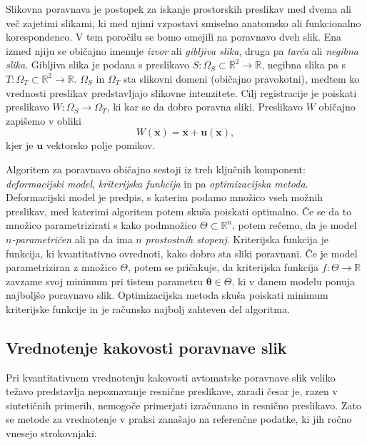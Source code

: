 \documentclass[journal]{IEEEtran}
\begin{document}
Slikovna poravnava je postopek za iskanje prostorskih preslikav med dvema ali več zajetimi slikami, ki med njimi vzpostavi smiselno anatomsko ali funkcionalno korespondenco. V tem poročilu se bomo omejili na poravnavo dveh slik. Ena izmed njiju se običajno imenuje \emph{izvor} ali \emph{gibljiva slika}, druga pa \emph{tarča} ali \emph{negibna slika}. Gibljiva slika je podana s preslikavo $S\colon\Omega_S\subset\mathbb{R}^2\to\mathbb{R}$, negibna slika pa s $T\colon\Omega_T\subset\mathbb{R}^2\to\mathbb{R}$. $\Omega_S$ in $\Omega_T$ sta slikovni domeni (običajno pravokotni), medtem ko vrednosti preslikav predstavljajo slikovne intenzitete. Cilj registracije je poiskati preslikavo $W\colon\Omega_S\to\Omega_T$, ki kar se da dobro poravna sliki. Preslikavo $W$ običajno zapišemo v obliki
\begin{equation}
 W(\boldsymbol{x}) = \boldsymbol{x} + \boldsymbol{u}(\boldsymbol{x}),
\end{equation}
kjer je $\boldsymbol{u}$ vektorsko polje pomikov.

Algoritem za poravnavo običajno sestoji iz treh ključnih komponent: \emph{deformacijski model}, \emph{kriterijska funkcija} in pa \emph{optimizacijska metoda}. Deformacijski model je predpis, s katerim podamo množico vseh možnih preslikav, med katerimi algoritem potem skuša poiskati optimalno. Če se da to množico parametrizirati s kako podmnožico $\Theta\subset\mathbb{R}^n$, potem rečemo, da je model \emph{$n$-parametričen} ali pa da ima $n$ \emph{prostostnih stopenj}. Kriterijska funkcija je funkcija, ki kvantitativno ovrednoti, kako dobro sta sliki poravnani. Če je model parametriziran z množico $\Theta$, potem se pričakuje, da kriterijska funkcija $f\colon\Theta\to\mathbb{R}$ zavzame svoj minimum pri tistem parametru $\boldsymbol{\theta}\in\Theta$, ki v danem modelu ponuja najboljšo poravnavo slik. Optimizacijska metoda skuša poiskati minimum kriterijske funkcije in je računsko najbolj zahteven del algoritma.

\subsection{Vrednotenje kakovosti poravnave slik}

Pri kvantitativnem vrednotenju kakovosti avtomatske poravnave slik veliko težavo predstavlja nepoznavanje resnične preslikave, zaradi česar je, razen v sintetičnih primerih, nemogoče primerjati izračunano in resnično preslikavo. Zato se metode za vrednotenje v praksi zanašajo na referenčne podatke, ki jih ročno vnesejo strokovnjaki.
\end{document}

